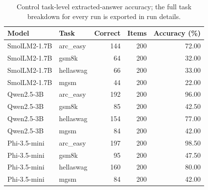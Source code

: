 \begin{table}[tbp]
\centering\small
\caption{Control task-level extracted-answer accuracy; the full task breakdown for every run is exported in run details.}\label{tab:tasks}
\begin{tabular}{llrrr}\toprule
Model & Task & Correct & Items & Accuracy (\%) \\
\midrule
SmolLM2-1.7B & arc\_easy & 144 & 200 & 72.00 \\
SmolLM2-1.7B & gsm8k & 64 & 200 & 32.00 \\
SmolLM2-1.7B & hellaswag & 66 & 200 & 33.00 \\
SmolLM2-1.7B & mgsm & 44 & 200 & 22.00 \\
Qwen2.5-3B & arc\_easy & 192 & 200 & 96.00 \\
Qwen2.5-3B & gsm8k & 85 & 200 & 42.50 \\
Qwen2.5-3B & hellaswag & 154 & 200 & 77.00 \\
Qwen2.5-3B & mgsm & 84 & 200 & 42.00 \\
Phi-3.5-mini & arc\_easy & 197 & 200 & 98.50 \\
Phi-3.5-mini & gsm8k & 95 & 200 & 47.50 \\
Phi-3.5-mini & hellaswag & 160 & 200 & 80.00 \\
Phi-3.5-mini & mgsm & 84 & 200 & 42.00 \\
\bottomrule\end{tabular}
\end{table}
